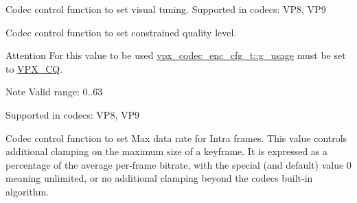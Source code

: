 \begin{Desc}
\begin{description}
\item[{\em 
V\+P8\+E\+\_\+\+S\+E\+T\+\_\+\+T\+U\+N\+I\+NG\hypertarget{group__vp8__encoder_gga6deae3d561c838952552c3d3756322eca126ccbe7bde63b59cec5ea68a82dd498}{}\label{group__vp8__encoder_gga6deae3d561c838952552c3d3756322eca126ccbe7bde63b59cec5ea68a82dd498}
}]Codec control function to set visual tuning. Supported in codecs\+: V\+P8, V\+P9 \item[{\em 
V\+P8\+E\+\_\+\+S\+E\+T\+\_\+\+C\+Q\+\_\+\+L\+E\+V\+EL\hypertarget{group__vp8__encoder_gga6deae3d561c838952552c3d3756322ecacd4f5b730bddb9788c3d0b82218ec503}{}\label{group__vp8__encoder_gga6deae3d561c838952552c3d3756322ecacd4f5b730bddb9788c3d0b82218ec503}
}]Codec control function to set constrained quality level. \begin{DoxyAttention}{Attention}
For this value to be used \hyperlink{structvpx__codec__enc__cfg_a5bcf7fc1efc4890de351e3c6fe252355}{vpx\+\_\+codec\+\_\+enc\+\_\+cfg\+\_\+t\+::g\+\_\+usage} must be set to \hyperlink{group__encoder_ggaf50e74d91be4cae6f70dfeba5b7410d2a5f2fd02b55c67d62bfd79380bcb03f63}{V\+P\+X\+\_\+\+CQ}. 
\end{DoxyAttention}
\begin{DoxyNote}{Note}
Valid range\+: 0..63
\end{DoxyNote}
Supported in codecs\+: V\+P8, V\+P9 \item[{\em 
V\+P8\+E\+\_\+\+S\+E\+T\+\_\+\+M\+A\+X\+\_\+\+I\+N\+T\+R\+A\+\_\+\+B\+I\+T\+R\+A\+T\+E\+\_\+\+P\+CT\hypertarget{group__vp8__encoder_gga6deae3d561c838952552c3d3756322eca09c69ff4a3aabdb307d4f24027dfc4c1}{}\label{group__vp8__encoder_gga6deae3d561c838952552c3d3756322eca09c69ff4a3aabdb307d4f24027dfc4c1}
}]Codec control function to set Max data rate for Intra frames. This value controls additional clamping on the maximum size of a keyframe. It is expressed as a percentage of the average per-\/frame bitrate, with the special (and default) value 0 meaning unlimited, or no additional clamping beyond the codec\textquotesingle{}s built-\/in algorithm.


\end{description}
\end{Desc}
